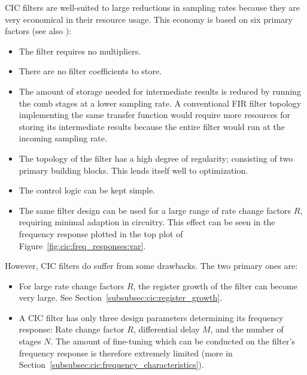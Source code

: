 CIC filters are well-suited to large reductions in sampling rates because they
are very  economical in  their resource  usage. This economy  is based  on six
primary factors (see also \cite{1163535}):
\begin{itemize}\tightlist
    \item
        The filter requires no multipliers.
    \item
        There are no filter coefficients to store.
    \item
        The amount  of storage needed  for intermediate results is  reduced by
        running the comb  stages at a lower sampling  rate. A conventional FIR
        filter topology implementing the  same transfer function would require
        more resources for storing its intermediate results because the entire
        filter would run at the incoming sampling rate.
    \item
        The  topology  of  the  filter   has  a  high  degree  of  regularity;
        consisting of two  primary building blocks. This lends  itself well to
        optimization.
    \item
        The control logic can be kept simple.
    \item
        The  same  filter  design can  be  used  for  a  large range  of  rate
        change  factors $R$,  requiring  minimal  adaption in  circuitry. This
        effect  can be  seen  in the  frequency response  plotted  in the  top
        plot of  Figure~\ref{fig:cic:freq_responses:var}.
\end{itemize}

However, CIC filters do suffer from some drawbacks. The two primary ones are:
\begin{itemize}\tightlist
    \item
        For    large     rate    change    factors    $R$,     the    register
        growth    of     the    filter    can    become     very    large. See
        Section~\ref{subsubsec:cic:register_growth}.
    \item
        A   CIC  filter   has   only  three   design  parameters   determining
        its   frequency  response: Rate   change   factor  $R$,   differential
        delay   $M$,    and   the    number   of   stages    $N$. The   amount
        of   fine-tuning   which   can    be   conducted   on   the   filter's
        frequency   response  is   therefore   extremely   limited  (more   in
        Section~\ref{subsubsec:cic:frequency_characteristics}).
\end{itemize}

